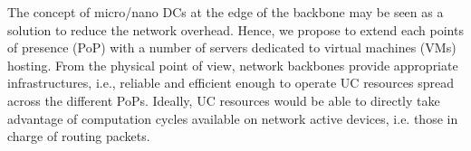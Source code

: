 
The concept of micro/nano DCs at the edge of the backbone \cite{greenberg:2008} 
may be seen as a solution to reduce the network overhead. Hence, we propose to 
extend each points of presence (PoP) with a number of servers dedicated to 
virtual machines (VMs) hosting. From the physical point of view, network 
backbones provide appropriate infrastructures, i.e., reliable and efficient 
enough to operate UC resources spread across the different PoPs. Ideally, UC 
resources would be able to directly take advantage of computation cycles 
available on network active devices, i.e. those in charge of routing packets.









